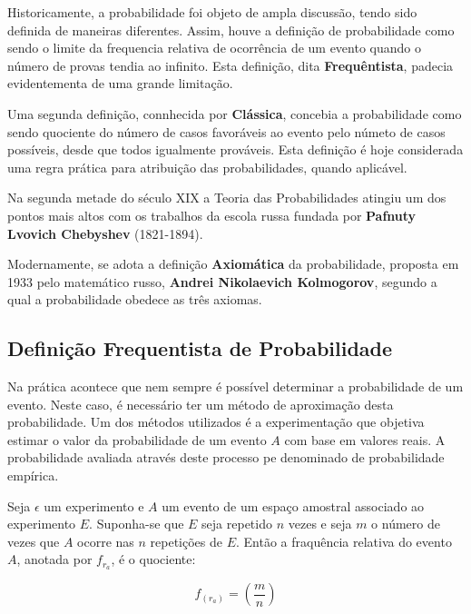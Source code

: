 \inic Historicamente, a probabilidade foi objeto de ampla discussão, tendo sido definida de maneiras diferentes. Assim, houve a definição de probabilidade como sendo o limite da frequencia relativa de ocorrência de um evento quando o número de provas tendia ao infinito. Esta definição, dita \textbf{Frequêntista}, padecia evidentementa de uma grande limitação.\vskip0.3cm
 
\inic Uma segunda definição, connhecida por \textbf{Clássica}, concebia a probabilidade como sendo quociente do número de casos favoráveis ao evento pelo númeto de casos possíveis, desde que todos igualmente prováveis. Esta definição é hoje considerada uma regra prática para atribuição das probabilidades, quando aplicável.\vskip0.3cm

\inic Na segunda metade do século XIX a Teoria das Probabilidades atingiu um dos pontos mais altos com os trabalhos da escola russa fundada por \textbf{Pafnuty Lvovich Chebyshev} (1821-1894).\vskip0.3cm
 
\inic Modernamente, se adota a definição \textbf{Axiomática} da probabilidade, proposta em 1933 pelo matemático russo, \textbf{Andrei Nikolaevich Kolmogorov}, segundo a qual a probabilidade obedece as três axiomas.
 




 
\subsection{Definição Frequentista de Probabilidade}

\inic Na prática acontece que nem sempre é possível determinar a probabilidade de um evento. Neste caso, é necessário ter um método de aproximação desta probabilidade. Um dos métodos utilizados é a experimentação que objetiva estimar o valor da probabilidade de um evento $A$ com base em valores reais. A probabilidade avaliada através deste processo pe denominado de probabilidade empírica.\vskip0.3cm

\inic Seja $\epsilon$ um experimento e $A$ um evento de um espaço amostral associado ao experimento $E$. Suponha-se que $E$ seja repetido $n$ vezes e seja $m$ o número de vezes que $A$ ocorre nas $n$ repetições de $E$. Então a fraquência relativa do evento $A$, anotada por $f_{r_{a}}$, é o quociente:
 
\begin{equation}
     f_{(r_{a})}= \left( \frac{m}{n} \right)
\end{equation}
 
